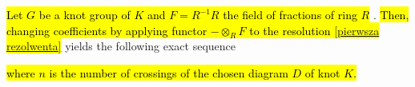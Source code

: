 \begin{proposition}
  \hl{Let $G$ be a knot group of $K$ and $F=R^{-1}R$ the field of fractions of ring $R$} \cite{atiyah}. \hl{Then, changing coefficients by applying functor $-\otimes_R F$ to the resolution \eqref{pierwsza rezolwenta}}
  yields the following exact sequence
  \begin{center}
  \end{center}
  \hl{where $n$ is the number of crossings of the chosen diagram $D$ of knot $K$.}
\end{proposition}


